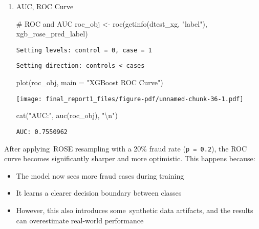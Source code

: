 \documentclass[
  11pt,
  letterpaper,
  DIV=11,
  numbers=noendperiod]{scrartcl}
\newenvironment{Shaded}{}{}
\newcommand{\AttributeTok}[1]{\textcolor[rgb]{0.84,0.23,0.29}{#1}}
\newcommand{\CommentTok}[1]{\textcolor[rgb]{0.42,0.45,0.49}{#1}}
\newcommand{\FunctionTok}[1]{\textcolor[rgb]{0.44,0.26,0.76}{#1}}
\newcommand{\NormalTok}[1]{\textcolor[rgb]{0.14,0.16,0.18}{#1}}
\newcommand{\OtherTok}[1]{\textcolor[rgb]{0.44,0.26,0.76}{#1}}
\newcommand{\SpecialCharTok}[1]{\textcolor[rgb]{0.00,0.36,0.77}{#1}}
\newcommand{\StringTok}[1]{\textcolor[rgb]{0.01,0.18,0.38}{#1}}
\begin{document}
\begin{enumerate}
\def\labelenumi{\arabic{enumi}.}
\setcounter{enumi}{7}
\item
  AUC, ROC Curve

\begin{Shaded}
\begin{Highlighting}[]
\CommentTok{\# ROC and AUC}
\NormalTok{roc\_obj }\OtherTok{\textless{}{-}} \FunctionTok{roc}\NormalTok{(}\FunctionTok{getinfo}\NormalTok{(dtest\_xg, }\StringTok{"label"}\NormalTok{), xgb\_rose\_pred\_label)}
\end{Highlighting}
\end{Shaded}

\begin{verbatim}
Setting levels: control = 0, case = 1
\end{verbatim}

\begin{verbatim}
Setting direction: controls < cases
\end{verbatim}

\begin{Shaded}
\begin{Highlighting}[]
\FunctionTok{plot}\NormalTok{(roc\_obj, }\AttributeTok{main =} \StringTok{"XGBoost ROC Curve"}\NormalTok{)}
\end{Highlighting}
\end{Shaded}

  \texttt{[image: final\_report1\_files/figure-pdf/unnamed-chunk-36-1.pdf]}

\begin{Shaded}
\begin{Highlighting}[]
\FunctionTok{cat}\NormalTok{(}\StringTok{"AUC:"}\NormalTok{, }\FunctionTok{auc}\NormalTok{(roc\_obj), }\StringTok{"}\SpecialCharTok{\textbackslash{}n}\StringTok{"}\NormalTok{)}
\end{Highlighting}
\end{Shaded}

\begin{verbatim}
AUC: 0.7550962 
\end{verbatim}
\end{enumerate}

After applying~ROSE resampling with a 20\% fraud rate
(\texttt{p\ =\ 0.2}), the ROC curve becomes significantly sharper and
more optimistic. This happens because:

\begin{itemize}
\item
  The model now sees more fraud cases during training
\item
  It learns a clearer decision boundary between classes
\item
  However, this also introduces some~synthetic data artifacts, and the
  results can overestimate real-world performance
\end{itemize}
\end{document}
